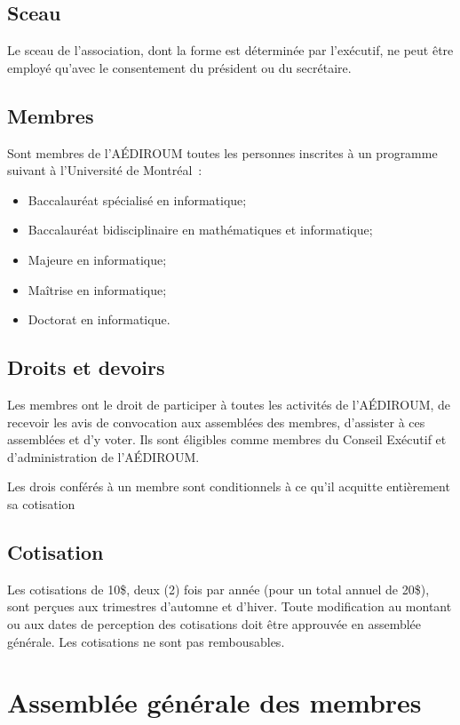 \documentclass{aediroum}
\begin{document}
\subsection{Sceau}\label{sec:sceau}
Le sceau de l'association, dont la forme est déterminée par l'exécutif, ne peut être employé qu'avec le consentement du président ou du secrétaire.

\subsection{Membres}\label{sec:membres}
Sont membres de l'AÉDIROUM toutes les personnes inscrites à un programme suivant à l'Université de Montréal~:
\begin{itemize}
\item Baccalauréat spécialisé en informatique;
\item Baccalauréat bidisciplinaire en mathématiques et informatique;
\item Majeure en informatique;
\item Maîtrise en informatique;
\item Doctorat en informatique.
\end{itemize}

\subsection{Droits et devoirs}\label{sec:droits-et-devoirs}

Les membres ont le droit de participer à toutes les activités de l'AÉDIROUM, de recevoir les avis de convocation aux assemblées des membres, d'assister à ces assemblées et d'y voter. Ils sont éligibles comme membres du Conseil Exécutif et d'administration de l'AÉDIROUM.

Les drois conférés à un membre sont conditionnels à ce qu'il acquitte entièrement sa cotisation

\subsection{Cotisation}\label{sec:cotisation}

Les cotisations de 10\$, deux (2) fois par année (pour un total annuel de 20\$), sont perçues aux trimestres d'automne et d'hiver. Toute modification au montant ou aux dates de perception des cotisations doit être approuvée en assemblée générale. Les cotisations ne sont pas rembousables.

\section{Assemblée générale des membres}\label{sec:assemblee-generale-des-membres}
\end{document}
